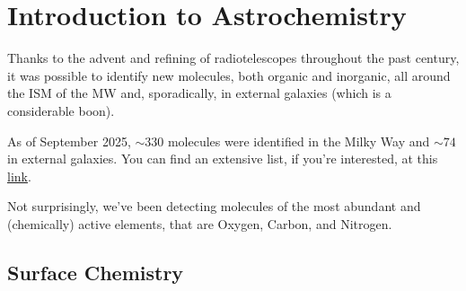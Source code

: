 
\chapter{Introduction to Astrochemistry}\label{ch:ii}

Thanks to the advent and refining of radiotelescopes throughout the past century, it was possible to identify new molecules, both organic and inorganic, all around the ISM of the MW and, sporadically, in external galaxies (which is a considerable boon).
\par As of September 2025, $\sim 330$ molecules were identified in the Milky Way and $\sim 74$ in external galaxies. You can find an extensive list, if you're interested, at this \href{www.astro.uni-koeln.de/cdms/molecules}{link}.
\par Not surprisingly, we've been detecting molecules of the most abundant and (chemically) active elements, that are Oxygen, Carbon, and Nitrogen.

\section{Surface Chemistry}

